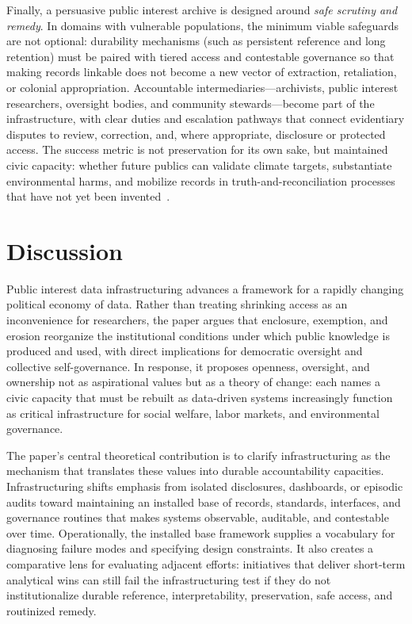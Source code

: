 \documentclass[acmsmall,screen]{acmart}
\begin{document}
Finally, a persuasive public interest archive is designed around \emph{safe scrutiny and remedy}. In domains with vulnerable populations, the minimum viable safeguards are not optional: durability mechanisms (such as persistent reference and long retention) must be paired with tiered access and contestable governance so that making records linkable does not become a new vector of extraction, retaliation, or colonial appropriation. Accountable intermediaries---archivists, public interest researchers, oversight bodies, and community stewards---become part of the infrastructure, with clear duties and escalation pathways that connect evidentiary disputes to review, correction, and, where appropriate, disclosure or protected access. The success metric is not preservation for its own sake, but maintained civic capacity: whether future publics can validate climate targets, substantiate environmental harms, and mobilize records in truth-and-reconciliation processes that have not yet been invented~\cite{viebachEvidenceUseArchives2022,robinson-sweetTruthReconciliationArchivists2018}.

\section*{Discussion}
Public interest data infrastructuring advances a framework for a rapidly changing political economy of data. Rather than treating shrinking access as an inconvenience for researchers, the paper argues that enclosure, exemption, and erosion reorganize the institutional conditions under which public knowledge is produced and used, with direct implications for democratic oversight and collective self-governance. In response, it proposes openness, oversight, and ownership not as aspirational values but as a theory of change: each names a civic capacity that must be rebuilt as data-driven systems increasingly function as critical infrastructure for social welfare, labor markets, and environmental governance.

The paper's central theoretical contribution is to clarify infrastructuring as the mechanism that translates these values into durable accountability capacities. Infrastructuring shifts emphasis from isolated disclosures, dashboards, or episodic audits toward maintaining an installed base of records, standards, interfaces, and governance routines that makes systems observable, auditable, and contestable over time. Operationally, the installed base framework supplies a vocabulary for diagnosing failure modes and specifying design constraints. It also creates a comparative lens for evaluating adjacent efforts: initiatives that deliver short-term analytical wins can still fail the infrastructuring test if they do not institutionalize durable reference, interpretability, preservation, safe access, and routinized remedy.
\end{document}

